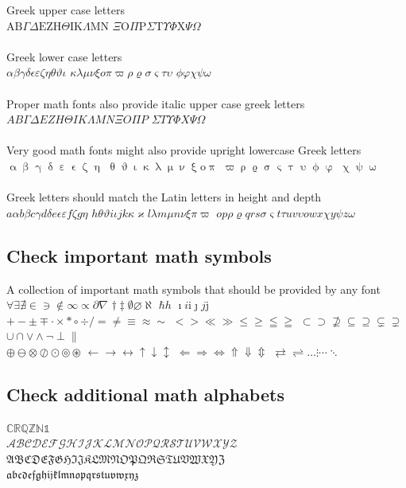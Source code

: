 \documentclass{scrartcl}
\renewcommand*{\i}{\ensuremath{\mathrm{i}}}
\renewcommand*{\j}{\ensuremath{\mathrm{j}}}
\begin{document}
Greek upper case letters\\
$\mathrm{AB}\Gamma\Delta\mathrm{EZH}\Theta\mathrm{IK}\Lambda\mathrm{MN}$%
$\Xi\mathrm{O}\Pi\mathrm{P}\Sigma\mathrm{T}\Upsilon\Phi\mathrm{X}\Psi\Omega$
\\
\\Greek lower case letters\\
$\alpha\beta\gamma\delta\epsilon\varepsilon\zeta\eta\theta\vartheta\iota$%
$\kappa\lambda\mu\nu\xi o\pi\varpi\rho\varrho\sigma\varsigma\tau\upsilon$%
$\phi\varphi\chi\psi\omega$
\\
\\Proper math fonts also provide italic upper case greek letters\\
$AB\varGamma\varDelta EZH\varTheta IK\varLambda MN\varXi O\varPi P$%
$\varSigma T\varUpsilon\varPhi X\varPsi\varOmega$
\\
\\Very good math fonts might also provide upright lowercase Greek letters\\
$\upalpha\upbeta\upgamma\updelta\upepsilon\upvarepsilon\upzeta\upeta$%
$\uptheta\upvartheta\upiota\upkappa\uplambda\upmu\upnu\upxi\mathrm{o}\uppi$%
$\upvarpi\uprho\upvarrho\upsigma\upvarsigma\uptau\upupsilon\upphi\upvarphi$%
$\upchi\uppsi\upomega$
\\
\\Greek letters should match the Latin letters in height and depth\\
$a\alpha b\beta c\gamma d\delta e\epsilon\varepsilon f\zeta g\eta$%
$h\theta\vartheta i\iota jk\kappa\varkappa l\lambda m\mu n\nu\xi\pi\varpi$%
$op\rho\varrho qrs\sigma\varsigma t\tau uv\upsilon owx\chi y\psi z\omega$

\subsection{Check important math symbols}

A collection of important math symbols that should be provided by any font\\
$\forall \exists \nexists \in \ni \notin \infty \propto \partial \nabla$
$\dagger\ddagger \emptyset\varnothing \aleph$ $\hbar h$
$\imath i\i \jmath j\j$\\
$+-\pm\mp \cdot\times\ast\circ\div / =\neq\equiv\approx\sim$
$<>\ll\gg\leq\geq\leqq\geqq$
$\subset\supset\nsupseteq\subseteq\supseteq\subsetneq\supsetneq$
$\cup\cap \vee\wedge\neg \perp\parallel$ \\
$\oplus\ominus\otimes\oslash\odot\circledcirc\circledast$
$\leftarrow\rightarrow\leftrightarrow\uparrow\downarrow\updownarrow$
$\Leftarrow\Rightarrow\Leftrightarrow\Uparrow\Downarrow\Updownarrow$
$\rightleftarrows\rightleftharpoons\dots\vdots\cdots\ddots$

\subsection{Check additional math alphabets}
$\mathbb{C}\mathbb{R}\mathbb{Q}\mathbb{Z}\mathbb{N}\mathbb{1}$\\
$\mathcal{ABCDEFGHIJKLMNOPQRSTUVWXYZ}$\\
$\mathfrak{ABCDEFGHIJKLMNOPQRSTUVWXYZ}$\\
$\mathfrak{abcdefghijklmnopqrstuvwxyz}$
\end{document}

